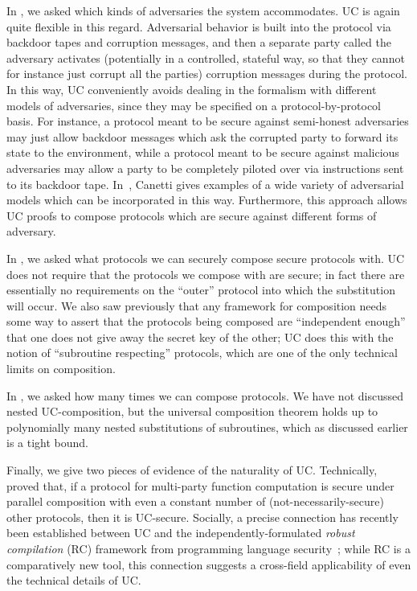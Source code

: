 In , we asked which kinds of adversaries the
system accommodates. UC is again quite flexible in this regard. Adversarial
behavior is built into the protocol via backdoor tapes and corruption messages,
and then a separate party called the adversary activates (potentially in a
controlled, stateful way, so that they cannot for instance just corrupt all the
parties) corruption messages during the protocol. In this way, UC conveniently
avoids dealing in the formalism with different models of adversaries, since they
may be specified on a protocol-by-protocol basis. For instance, a protocol meant
to be secure against semi-honest adversaries may just allow backdoor messages
which ask the corrupted party to forward its state to the environment, while a
protocol meant to be secure against malicious adversaries may allow a party to
be completely piloted over via instructions sent to its backdoor tape.
In~\cite[Section 7.1.1]{canetti-2000}, Canetti gives examples of a wide variety
of adversarial models which can be incorporated in this way. Furthermore, this
approach allows UC proofs to compose protocols which are secure against
different forms of adversary.

In , we asked what protocols we can securely
compose secure protocols with. UC does not require that the protocols we compose
with are secure; in fact there are essentially no requirements on the ``outer''
protocol into which the substitution will occur. We also saw previously that any
framework for composition needs some way to assert that the protocols being
composed are ``independent enough'' that one does not give away the secret key
of the other; UC does this with the notion of ``subroutine respecting''
protocols, which are one of the only technical limits on composition.

In , we asked how many times we can compose
protocols. We have not discussed nested UC-composition, but the universal
composition theorem holds up to polynomially many nested substitutions of
subroutines, which as discussed earlier is a tight bound.

%
Finally, we give two pieces of evidence of the naturality of UC.
Technically,~\cite{lindell-2003} proved that, if a protocol for multi-party
function computation is secure under parallel composition with even a constant
number of (not-necessarily-secure) other protocols, then it is UC-secure.
Socially, a precise connection has recently been established between UC and the
independently-formulated \emph{robust compilation} (RC) framework from
programming language security~\cite{patrignani-2022}; while RC is a
comparatively new tool, this connection suggests a cross-field applicability of
even the technical details of UC.

